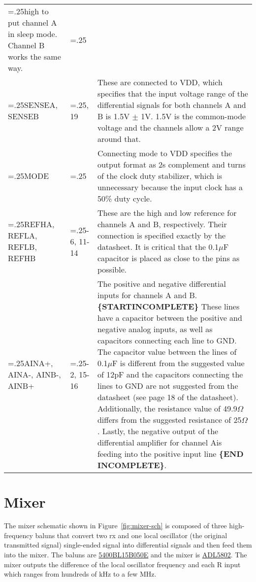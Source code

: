 \documentclass{default}
\begin{document}
\begin{tabularx}{\textwidth}{>{\hsize=.25\hsize} X >{\hsize=.25\hsize} XX}
  high to put channel A in sleep mode. Channel B works the same way. \\
  SENSEA, SENSEB & 62, 19 & These are connected to VDD, which specifies that the input voltage range
  of the differential signals for both channels A and B is 1.5V $\pm$ 1V. 1.5V is the common-mode
  voltage and the channels allow a 2V range around that. \\
  MODE & 60 & Connecting mode to VDD specifies the output format as 2s complement and turns of the clock duty stabilizer, which is unnecessary because the input clock has a 50\% duty cycle. \\
  REFHA, REFLA, REFLB, REFHB & 3-6, 11-14 & These are the high and low reference for channels A and
  B, respectively. Their connection is specified exactly by the datasheet. It is critical that the
  0.1$\mu$F capacitor is placed as close to the pins as possible. \\
  AINA+, AINA-, AINB-, AINB+ & 1-2, 15-16 & The positive and negative differential inputs for
  channels A and B. \textbf{\{STARTINCOMPLETE\}} These lines have a capacitor between the positive
  and negative analog inputs, as well as capacitors connecting each line to GND. The capacitor value
  between the lines of 0.1$\mu$F is different from the suggested value of 12pF and the capacitors
  connecting the lines to GND are not suggested from the datasheet (see page 18 of the
  datasheet). Additionally, the resistance value of 49.9$\Omega$ differs from the suggested
  resistance of 25$\Omega$. Lastly, the negative output of the differential amplifier for channel
  Ais feeding into the positive input line \textbf{\{END INCOMPLETE\}}. \\

  \bottomrule
\end{tabularx}

\section{Mixer}
The mixer schematic shown in Figure~\ref{fig:mixer-sch} is composed of three high-frequency baluns
that convert two rx and one local oscillator (the original transmitted signal) single-ended signal
into differential signals and then feed them into the mixer. The baluns are
\href{https://www.johansontechnology.com/datasheets/baluns/Balun_5400BL15B050.pdf}{5400BL15B050E}
and the mixer is
\href{http://www.analog.com/media/en/technical_documentation/data_sheets/ADL5802.pdf}{ADL5802}. The
mixer outputs the difference of the local oscillator frequency and each R input which ranges from
hundreds of kHz to a few MHz.
\end{document}
